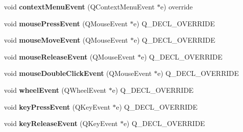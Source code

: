 \begin{DoxyCompactItemize}
\item 
void {\bfseries context\+Menu\+Event} (Q\+Context\+Menu\+Event $\ast$e) override\hypertarget{classgui_1_1DesignPanel_a134f44e881e22b194c984edb2dbe3555}{}\label{classgui_1_1DesignPanel_a134f44e881e22b194c984edb2dbe3555}

\item 
void {\bfseries mouse\+Press\+Event} (Q\+Mouse\+Event $\ast$e) Q\+\_\+\+D\+E\+C\+L\+\_\+\+O\+V\+E\+R\+R\+I\+DE\hypertarget{classgui_1_1DesignPanel_a1775b8ae7dca0e585250e606514c797c}{}\label{classgui_1_1DesignPanel_a1775b8ae7dca0e585250e606514c797c}

\item 
void {\bfseries mouse\+Move\+Event} (Q\+Mouse\+Event $\ast$e) Q\+\_\+\+D\+E\+C\+L\+\_\+\+O\+V\+E\+R\+R\+I\+DE\hypertarget{classgui_1_1DesignPanel_a4e327612e68a00f5c71493337cf5aea6}{}\label{classgui_1_1DesignPanel_a4e327612e68a00f5c71493337cf5aea6}

\item 
void {\bfseries mouse\+Release\+Event} (Q\+Mouse\+Event $\ast$e) Q\+\_\+\+D\+E\+C\+L\+\_\+\+O\+V\+E\+R\+R\+I\+DE\hypertarget{classgui_1_1DesignPanel_a8adf6a49955304d9e8f2b65fa48a8f89}{}\label{classgui_1_1DesignPanel_a8adf6a49955304d9e8f2b65fa48a8f89}

\item 
void {\bfseries mouse\+Double\+Click\+Event} (Q\+Mouse\+Event $\ast$e) Q\+\_\+\+D\+E\+C\+L\+\_\+\+O\+V\+E\+R\+R\+I\+DE\hypertarget{classgui_1_1DesignPanel_af9a9e3ae8d95eabe5b5d17068b5e7aa1}{}\label{classgui_1_1DesignPanel_af9a9e3ae8d95eabe5b5d17068b5e7aa1}

\item 
void {\bfseries wheel\+Event} (Q\+Wheel\+Event $\ast$e) Q\+\_\+\+D\+E\+C\+L\+\_\+\+O\+V\+E\+R\+R\+I\+DE\hypertarget{classgui_1_1DesignPanel_a05752d661dee8446a2af4978ac2d3829}{}\label{classgui_1_1DesignPanel_a05752d661dee8446a2af4978ac2d3829}

\item 
void {\bfseries key\+Press\+Event} (Q\+Key\+Event $\ast$e) Q\+\_\+\+D\+E\+C\+L\+\_\+\+O\+V\+E\+R\+R\+I\+DE\hypertarget{classgui_1_1DesignPanel_a9bbac534859f0a0cb66e834ae4eb9a6c}{}\label{classgui_1_1DesignPanel_a9bbac534859f0a0cb66e834ae4eb9a6c}

\item 
void {\bfseries key\+Release\+Event} (Q\+Key\+Event $\ast$e) Q\+\_\+\+D\+E\+C\+L\+\_\+\+O\+V\+E\+R\+R\+I\+DE\hypertarget{classgui_1_1DesignPanel_aa01690d27ab5063ade8b3402cf68a679}{}\label{classgui_1_1DesignPanel_aa01690d27ab5063ade8b3402cf68a679}

\end{DoxyCompactItemize}


